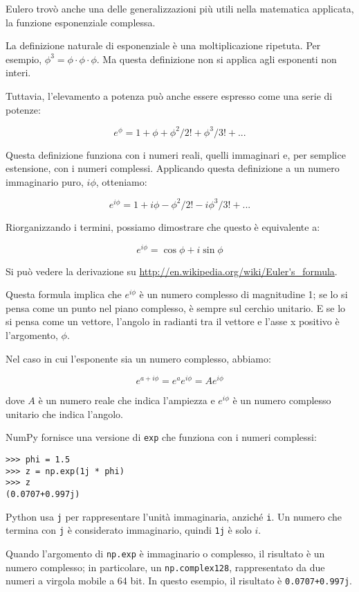 \documentclass[12pt,a4paper]{book}
\begin{document}
Eulero trovò anche una delle generalizzazioni più utili nella matematica applicata, la funzione esponenziale complessa.

La definizione naturale di esponenziale è una moltiplicazione ripetuta. Per esempio, $\phi^3 = \phi \cdot \phi \cdot \phi$. Ma questa definizione non si applica agli esponenti non interi.

Tuttavia, l'elevamento a potenza può anche essere espresso come una serie di potenze:

%
\[ e^\phi = 1 + \phi + \phi^2/2! + \phi^3/3! + ... \] 

%
Questa definizione funziona con i numeri reali, quelli immaginari e, per semplice estensione, con i numeri complessi. Applicando questa definizione a un numero immaginario puro, $i\phi$, otteniamo:

%
\[ e^{i\phi} = 1 + i\phi - \phi^2/2! - i\phi^3/3! + ... \] 

%
Riorganizzando i termini, possiamo dimostrare che questo è equivalente a:

%
\[ e^{i\phi} = \cos \phi + i \sin \phi \] 

%
Si può vedere la derivazione su \url{http://en.wikipedia.org/wiki/Euler's_formula}.

Questa formula implica che $e^{i\phi}$ è un numero complesso di magnitudine 1; se lo si pensa come un punto nel piano complesso, è sempre sul cerchio unitario. E se lo si pensa come un vettore, l'angolo in radianti tra il vettore e l'asse x positivo è l'argomento, $\phi$.

Nel caso in cui l'esponente sia un numero complesso, abbiamo:

%
\[ e^{a + i\phi} = e^a e^{i\phi} = A e^{i\phi} \] 

%
dove $A$ è un numero reale che indica l'ampiezza e $e^{i\phi}$ è un numero complesso unitario che indica l'angolo.

NumPy fornisce una versione di {\tt exp} che funziona con i numeri complessi:

\begin{verbatim} 
>>> phi = 1.5
>>> z = np.exp(1j * phi)
>>> z
(0.0707+0.997j)
 \end{verbatim} 

Python usa {\tt j} per rappresentare l'unità immaginaria, anziché {\tt i}. Un numero che termina con {\tt j} è considerato immaginario, quindi {\tt 1j} è solo $i$.

Quando l'argomento di {\tt np.exp} è immaginario o complesso, il risultato è un numero complesso; in particolare, un {\tt np.complex128}, rappresentato da due numeri a virgola mobile a 64 bit. In questo esempio, il risultato è {\tt 0.0707+0.997j}.
\end{document}
